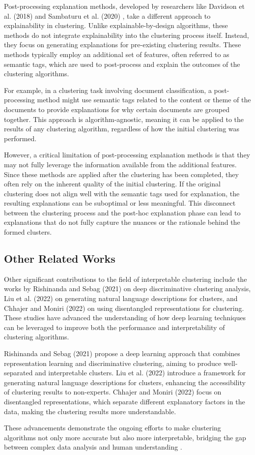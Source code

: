 Post-processing explanation methods, developed by researchers like Davidson et al. (2018) and Sambaturu et al. (2020) \citep{Sambaturu2020}, take a different approach to explainability in clustering. Unlike explainable-by-design algorithms, these methods do not integrate explainability into the clustering process itself. Instead, they focus on generating explanations for pre-existing clustering results. These methods typically employ an additional set of features, often referred to as semantic tags, which are used to post-process and explain the outcomes of the clustering algorithms.

For example, in a clustering task involving document classification, a post-processing method might use semantic tags related to the content or theme of the documents to provide explanations for why certain documents are grouped together. This approach is algorithm-agnostic, meaning it can be applied to the results of any clustering algorithm, regardless of how the initial clustering was performed.

However, a critical limitation of post-processing explanation methods is that they may not fully leverage the information available from the additional features. Since these methods are applied after the clustering has been completed, they often rely on the inherent quality of the initial clustering. If the original clustering does not align well with the semantic tags used for explanation, the resulting explanations can be suboptimal or less meaningful. This disconnect between the clustering process and the post-hoc explanation phase can lead to explanations that do not fully capture the nuances or the rationale behind the formed clusters.

\subsection{Other Related Works}

Other significant contributions to the field of interpretable clustering include the works by Rishinanda and Sebag (2021) on deep discriminative clustering analysis, Liu et al. (2022) on generating natural language descriptions for clusters, and Chhajer and Moniri (2022) on using disentangled representations for clustering. These studies have advanced the understanding of how deep learning techniques can be leveraged to improve both the performance and interpretability of clustering algorithms.

Rishinanda and Sebag (2021) propose a deep learning approach that combines representation learning and discriminative clustering, aiming to produce well-separated and interpretable clusters. Liu et al. (2022) introduce a framework for generating natural language descriptions for clusters, enhancing the accessibility of clustering results to non-experts. Chhajer and Moniri (2022) focus on disentangled representations, which separate different explanatory factors in the data, making the clustering results more understandable.

These advancements demonstrate the ongoing efforts to make clustering algorithms not only more accurate but also more interpretable, bridging the gap between complex data analysis and human understanding \cite{Rishinanda2021, Liu2022, Chhajer2022}.